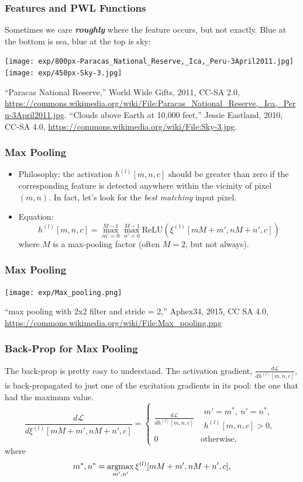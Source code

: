 \documentclass{beamer}
\newcommand{\argmax}{\operatornamewithlimits{argmax}}
\begin{document}
\begin{frame}
  \frametitle{Features and PWL Functions}

  Sometimes we care {\bf\em roughly} where the feature occurs, but not
  exactly.  Blue at the bottom is sea, blue at the top is sky:
  \centerline{\texttt{[image: exp/800px-Paracas\_National\_Reserve,\_Ica,\_Peru-3April2011.jpg]}\hspace*{1cm}\texttt{[image: exp/450px-Sky-3.jpg]}}
  \begin{tiny}
    ``Paracas National Reserve,'' World Wide Gifts, 2011, CC-SA 2.0,
    \url{https://commons.wikimedia.org/wiki/File:Paracas_National_Reserve,_Ica,_Peru-3April2011.jpg}.
    ``Clouds above Earth at 10,000 feet,'' Jessie Eastland, 2010, CC-SA 4.0,
    \url{https://commons.wikimedia.org/wiki/File:Sky-3.jpg}.
  \end{tiny}
\end{frame}

\begin{frame}
  \frametitle{Max Pooling}
  \begin{itemize}
  \item Philosophy: the activation $h^{(l)}[m,n,c]$ should be greater
    than zero if the corresponding feature is detected anywhere within
    the vicinity of pixel $(m,n)$.  In fact, let's look for the {\em
      best matching} input pixel.
  \item Equation:
    \begin{displaymath}
      h^{(l)}[m,n,c] = \max_{m'=0}^{M-1}\max_{n'=0}^{M-1} \mbox{ReLU}\left(\xi^{(l)}[mM+m',nM+n',c]\right)
    \end{displaymath}
    where $M$ is a max-pooling factor (often $M=2$, but not always).
  \end{itemize}
\end{frame}

\begin{frame}
  \frametitle{Max Pooling}
  \centerline{\texttt{[image: exp/Max\_pooling.png]}}
  \begin{tiny}
    ``max pooling with 2x2 filter and stride = 2,'' Aphex34, 2015, CC SA 4.0,
    \url{https://commons.wikimedia.org/wiki/File:Max_pooling.png}
  \end{tiny}
\end{frame}

\begin{frame}
  \frametitle{Back-Prop for Max Pooling}

  The back-prop is pretty easy to understand.  The activation gradient,
  $\frac{d{\mathcal L}}{dh^{(l)}[m,n,c]}$, is back-propagated to just one of
  the excitation gradients in its pool: the one that had the maximum value.
  \[
  \frac{d{\mathcal L}}{d\xi^{(l)}[mM+m',nM+n',c]}=
  \begin{cases}
    \frac{d{\mathcal L}}{dh^{(l)}[m,n,c]} & \begin{array}{l}m'=m^*,~n'=n^*,\\h^{(l)}[m,n,c]>0,\end{array}\\
    0 & \mbox{otherwise},
  \end{cases}
  \]
  where
  \[
  m^*,n^* =\argmax_{m',n'} \xi^{(l)}[mM+m',nM+n',c],
  \]
\end{frame}
\end{document}
